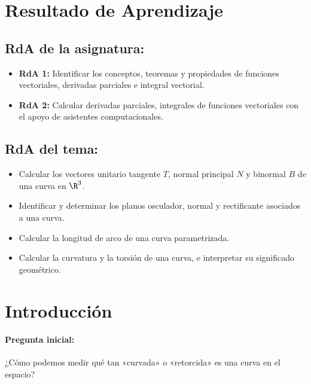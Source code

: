 \documentclass[a4,11pt]{aleph-notas}
\begin{document}
\encabezado

\section*{Resultado de Aprendizaje}

\subsection*{RdA de la asignatura:}
\begin{itemize}[leftmargin=*]
    \item \textbf{RdA 1:} Identificar los conceptos, teoremas y propiedades de funciones vectoriales, derivadas parciales e integral vectorial.
    \item \textbf{RdA 2:} Calcular derivadas parciales, integrales de funciones vectoriales con el apoyo de asistentes computacionales.
\end{itemize}

\subsection*{RdA del tema:}
\begin{itemize}[leftmargin=*]
    \item Calcular los vectores unitario tangente $T$, normal principal $N$ y binormal $B$ de una curva en $\R^3$.
    \item Identificar y determinar los planos osculador, normal y rectificante asociados a una curva.
    \item Calcular la longitud de arco de una curva parametrizada.
    \item Calcular la curvatura y la torsión de una curva, e interpretar su significado geométrico.
\end{itemize}

\section*{Introducción}

\paragraph{Pregunta inicial:}
¿Cómo podemos medir qué tan «curvada» o «retorcida» es una curva en el espacio?
\end{document}
